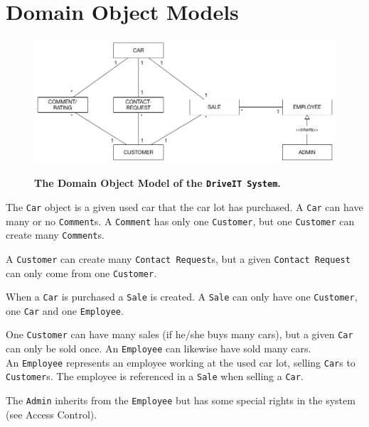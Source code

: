 \section{Domain Object Models}

\begin{figure}[H]
	\centering
		\includegraphics[scale=0.35]{Figures/DomainObjectModel}\\
	\caption{\textbf{The Domain Object Model of the \texttt{DriveIT System}.}}
  \label{fig:DomainObjectModel}
\end{figure}

The \texttt{Car} object is a given used car that the car lot has purchased. A \texttt{Car} can have many or no \texttt{Comment}s. A \texttt{Comment} has only one \texttt{Customer}, but one \texttt{Customer} can create many \texttt{Comment}s.

A \texttt{Customer} can create many \texttt{Contact Request}s, but a given \texttt{Contact Request} can only come from one \texttt{Customer}.

When a  \texttt{Car} is purchased a \texttt{Sale} is created. A \texttt{Sale} can only have one \texttt{Customer}, one \texttt{Car} and one \texttt{Employee}.

One \texttt{Customer} can have many sales (if he/she buys many cars), but a given \texttt{Car} can only be sold once. An \texttt{Employee} can likewise have sold many cars.\\ 
An \texttt{Employee} represents an employee working at the used car lot, selling \texttt{Car}s to \texttt{Customer}s. The employee is referenced in a \texttt{Sale} when selling a \texttt{Car}.  

The \texttt{Admin} inherits from the \texttt{Employee} but has some special rights in the system (see Access Control).